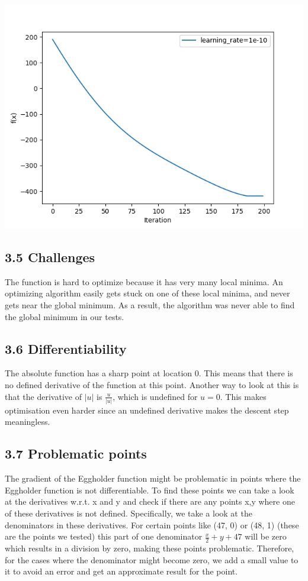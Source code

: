     \includegraphics[width=\textwidth / 2]{3_slow_learn}

    \subsection*{3.5 Challenges}
    The function is hard to optimize because it has very many local minima.
    An optimizing algorithm easily gets stuck on one of these local minima, and never gets near the global minimum.
    As a result, the algorithm was never able to find the global minimum in our tests.

    \subsection*{3.6 Differentiability}
    The absolute function has a sharp point at location $0$.
    This means that there is no defined derivative of the function at this point.
    Another way to look at this is that the derivative of $|u|$ is $\frac{u}{|u|}$, which is undefined for $u = 0$.
    This makes optimisation even harder since an undefined derivative makes the descent step meaningless.
    
    \subsection*{3.7 Problematic points}
    The gradient of the Eggholder function might be problematic in points where the Eggholder function is not differentiable. To find these points 	we can take a look at the derivatives w.r.t. x and y and check if there are any points x,y where one of these derivatives is not defined. 
	Specifically, we take a look at the denominators in these derivatives. For certain points like (47, 0) or (48, 1) (these are the points we 			tested) this part of one denominator $\frac{x}{2} + y + 47$ will be zero which results in a division by zero, making these points problematic. 	Therefore, for the cases where the denominator might become zero, we add a small value to it to avoid an error and get an approximate result 		for the point.



